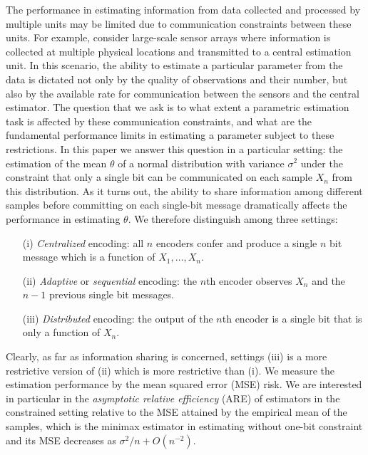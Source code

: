 \documentclass[letterpaper, conference,9pt]{IEEEtran}      %
\begin{document}
The performance in estimating information from data collected and processed by multiple units may be limited due to communication constraints between these units. 
For example, consider large-scale sensor arrays where information is collected at multiple physical locations and transmitted to a central estimation unit. In this scenario, the ability to estimate a particular parameter from the data is dictated not only by the quality of observations and their number, but also by the available rate for communication between the sensors and the central estimator. The question that we ask is to what extent a parametric estimation task is affected by these communication constraints, and what are the fundamental performance limits in estimating a parameter subject to these restrictions. In this paper we answer this question in a particular setting: the estimation of the mean $\theta$ of a normal distribution with variance $\sigma^2$ under the constraint that only a single bit can be communicated on each sample $X_n$ from this distribution. As it turns out, the ability to share information among different samples before committing on each single-bit message dramatically affects the performance in estimating $\theta$. We therefore distinguish among three settings:
 \begin{itemize}
 \item[(i)] \emph{Centralized} encoding: all $n$ encoders confer and produce a single $n$ bit message which is a function of $X_1,\ldots,X_n$. 
 \item[(ii)] \emph{Adaptive} or \emph{sequential} encoding: the $n$th encoder observes $X_n$ and the $n-1$ previous single bit messages.
 \item[(iii)] \emph{Distributed} encoding: the output of the $n$th encoder is a single bit that is only a function of $X_n$.
 \end{itemize}
Clearly, as far as information sharing is concerned, settings (iii) is a more restrictive version of (ii) which is more restrictive than (i). We measure the estimation performance by the mean squared error (MSE) risk. We are interested in particular in the \emph{asymptotic relative efficiency} (ARE) of estimators in the constrained setting relative to the MSE attained by the empirical mean of the samples, which is the minimax estimator in estimating without one-bit constraint and its MSE decreases as $\sigma^2/n+O(n^{-2})$. \\
\end{document}
